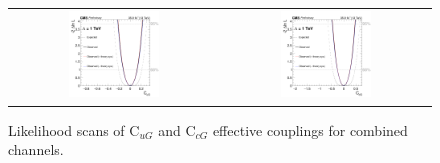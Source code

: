 \begin{figure}[ht]
  \begin{center}
    \begin{tabular}{cc}
      \includegraphics[width=0.45\textwidth]{figures/tW/fig/scan_all_plot/Cug_combined_scan.png}&
      \includegraphics[width=0.45\textwidth]{figures/tW/fig/scan_all_plot/Ccg_combined_scan.png}\\
    \end{tabular}
    \caption{Likelihood scans of C$_{uG}$ and C$_{cG}$ effective couplings for combined channels.
    \label{fig:FCNC_scan}}
  \end{center}
\end{figure}

